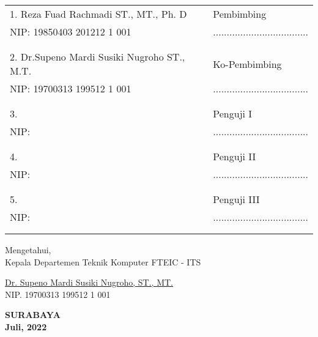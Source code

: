     \noindent
    \begin{tabularx}{\textwidth}{X l}
      1. Reza Fuad Rachmadi ST., MT., Ph. D          & Pembimbing \\
      NIP: 19850403 201212 1 001        & ................................... \\
      &  \\
      &  \\
      2. Dr.Supeno Mardi Susiki Nugroho ST., M.T.     & Ko-Pembimbing \\
      NIP: 19700313 199512 1 001        & ................................... \\
      &  \\
      &  \\
      3.          & Penguji I \\
      NIP:         & ................................... \\
      &  \\
      &  \\
      4.       & Penguji II \\
      NIP:         & ................................... \\
      &  \\
      &  \\
      5.                      & Penguji III \\
      NIP:         & ................................... \\
      &  \\
      &  \\
    \end{tabularx}
  \endgroup


  \begin{center}
    Mengetahui, \\
    Kepala Departemen Teknik Komputer FTEIC - ITS \\

    \vspace{8ex}

    \underline{Dr. Supeno Mardi Susiki Nugroho, ST., MT.} \\
    NIP. 19700313 199512 1 001
  \end{center}

  \begin{center}
    \textbf{SURABAYA\\Juli, 2022}
  \end{center}
\endgroup
